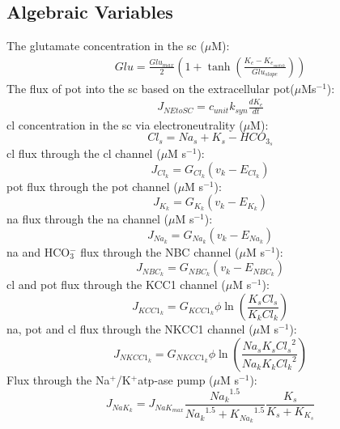 \documentclass[11pt]{elsarticle}
\newcommand{\sodpot}{Na$^+$/K$^+$\xspace}
\newcommand{\hco}{HCO$_3^-$\xspace}
\newcommand{\mus}{$\mu$M s$^{-1}$\xspace}
\newcommand{\uM}{$\mu$M\xspace}
\newcommand{\na}{\gls{na}\xspace}
\newcommand{\pot}{\gls{pot}\xspace}
\newcommand{\cl}{\gls{cl}\xspace}
\begin{document}
			\subsection{Algebraic Variables}
The glutamate concentration in the \gls{sc} (\uM):
\begin{align}
Glu = \frac{Glu_{max}}{2} \left( 1 + \tanh \left( \frac{K_e - K_{e_{switch}}}{Glu_{slope}}  \right)  \right)
\end{align}
%				
The flux of \pot into the \gls{sc} based on the extracellular \pot ($\mu$Ms$^{-1}$):
\begin{align}
J_{NEtoSC} = c_{unit} k_{syn}  \frac{d K_e}{dt}   
\end{align}
%
\cl concentration in the \gls{sc} via electroneutrality (\uM): 
\begin{equation} \label{eq:ClEx}
Cl_s = Na_s + K_s - HCO_{3_s}
\end{equation}
%
\cl flux through the \cl channel (\mus): 
\begin{equation} \label{eq:J_Cl}
J_{Cl_k}=G_{Cl_{k}}(v_k - E_{Cl_k})
\end{equation}
%
\pot flux through the \pot channel (\mus): 
\begin{equation} \label{eq:J_K}
J_{K_k}=G_{K_{k}}(v_k - E_{K_k})
\end{equation}
%
\na flux through the \na channel (\mus):
\begin{equation} \label{eq:J_Na}
J_{Na_k}=G_{Na_{k}}(v_k - E_{Na_k})
\end{equation}
%
\na and \hco flux through the NBC channel (\mus): 
\begin{equation} \label{eq:J_NBC}
J_{NBC_k}=G_{NBC_k}\left(  v_k -E_{NBC_k}  \right)
\end{equation}
%
\cl and \pot flux through the KCC1 channel (\mus): 
\begin{equation} \label{eq:J_KCC1}
J_{KCC1_k}=G_{KCC1_k} \phi \ln \left(\frac{K_s Cl_s }{K_k Cl_k}\right)
\end{equation}
%
\na, \pot and \cl flux through the NKCC1 channel (\mus): 
\begin{equation} \label{eq:J_NKCC1}
J_{NKCC1_k}=G_{NKCC1_k} \phi \ln \left(\frac{Na_s K_s {Cl_s}^2}{Na_k K_k {Cl_k}^2}\right)
\end{equation}
%
Flux through the \sodpot \gls{atp}-ase pump (\mus): 
\begin{equation} \label{eq:J_NaK_s}
J_{NaK_{k}}=J_{NaK_{max}}\frac{{Na_k}^{1.5}}{{Na_k}^{1.5}+{K_{Na_k}}^{1.5}}\frac{K_s}{K_s+K_{K_s}}
\end{equation}
\end{document}

